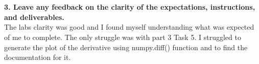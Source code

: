 \documentclass[12pt]{report}
\begin{document}
\\ \\ \textbf{3. Leave any feedback on the clarity of the expectations, instructions, and deliverables.}
\\The labs clarity was good and I found myself understanding what was expected of me to complete. The only struggle was with part 3 Task 5. I struggled to generate the plot of the derivative using numpy.diff() function and to find the documentation for it.
\end{document}
